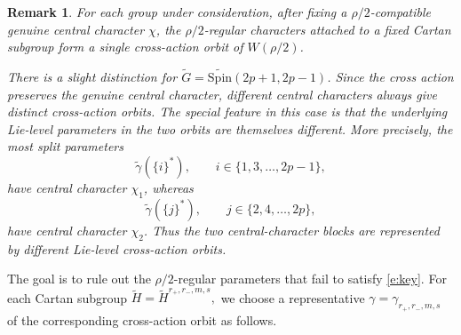 \documentclass{amsart}
\newcommand{\Spin}{{\mathrm{Spin}}}
\newtheorem{remark}[thm]{Remark}
\theoremstyle{definition}
\begin{document}
\begin{remark}\label{r:orbit}
For each group under consideration, after fixing a
\(\rho/2\)-compatible genuine central character \(\chi\), the
\(\rho/2\)-regular characters attached to a fixed Cartan subgroup
form a single cross-action orbit of \(W(\rho/2)\).

There is a slight distinction for
\(\widetilde G=\widetilde{\Spin}(2p+1,2p-1)\).
Since the cross action preserves the genuine central character,
different central characters always give distinct cross-action
orbits. The special feature in this case is that the underlying
Lie-level parameters in the two orbits are themselves different.
More precisely, the most split parameters
\[
\widetilde\gamma(\{i\}^*),
\qquad
i\in\{1,3,\ldots,2p-1\},
\]
have central character \(\chi_1\), whereas
\[
\widetilde\gamma(\{j\}^*),
\qquad
j\in\{2,4,\ldots,2p\},
\]
have central character \(\chi_2\).
Thus the two central-character blocks are represented by different
Lie-level cross-action orbits.
\end{remark}

The goal is to rule out the \(\rho/2\)-regular parameters that fail
to satisfy \eqref{e:key}. For each Cartan subgroup
$\widetilde H=\widetilde H^{r_+,r_-,m,s},$
we choose a representative
$\gamma=\gamma_{r_+,r_-,m,s}$ of the corresponding cross-action orbit as follows.
\end{document}
